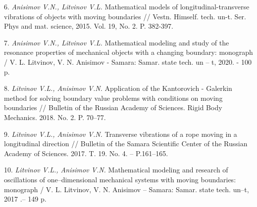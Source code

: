 6. {\it Anisimov V.N., Litvinov V.L.} Mathematical models of longitudinal-transverse vibrations of objects with moving boundaries // Vestn. Himself. tech. un-t. Ser. Phys and mat. science, 2015. Vol. 19, No. 2. P. 382-397.

7. {\it Anisimov V.N., Litvinov V.L.} Mathematical modeling and study of the resonance properties of mechanical objects with a changing boundary: monograph / V. L. Litvinov, V. N. Anisimov - Samara: Samar. state tech. un -- t, 2020. - 100 p.

8. {\it Litvinov V.L., Anisimov V.N.} Application of the Kantorovich - Galerkin method for solving boundary value problems with conditions on moving boundaries // Bulletin of the Russian Academy of Sciences. Rigid Body Mechanics. 2018. No. 2. P. 70--77.

9. {\it Litvinov V.L., Anisimov V.N.} Transverse vibrations of a rope moving in a longitudinal direction // Bulletin of the Samara Scientific Center of the Russian Academy of Sciences. 2017. T. 19. No. 4. -- P.161--165.

10. {\it Litvinov V.L., Anisimov V.N.} Mathematical modeling and research of oscillations of one--dimensional mechanical systems with moving boundaries: monograph / V. L. Litvinov, V. N. Anisimov -- Samara: Samar. state tech. un--t, 2017 .-- 149 p.
